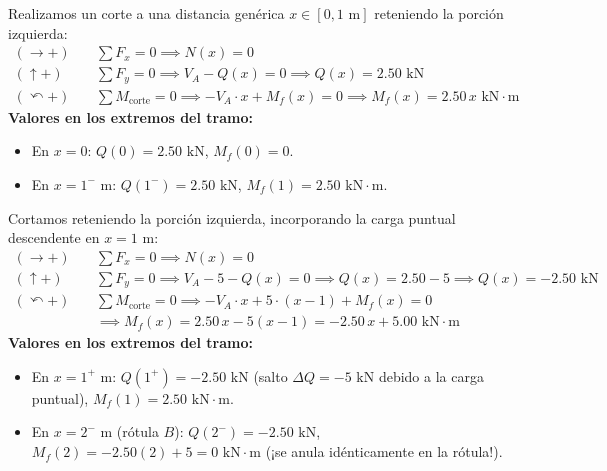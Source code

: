 Realizamos un corte a una distancia genérica $x \in [0, 1\text{ m}]$ reteniendo la porción izquierda:
\begin{align*}
    (\rightarrow +) \quad &\sum F_x = 0 \implies \boxed{N(x) = 0} \\
    (\uparrow +) \quad &\sum F_y = 0 \implies V_A - Q(x) = 0 \implies \boxed{Q(x) = 2.50\text{ kN}} \\
    (\curvearrowleft +) \quad &\sum M_{\text{corte}} = 0 \implies -V_A \cdot x + M_f(x) = 0 \implies \boxed{M_f(x) = 2.50\,x\text{ kN}\cdot\text{m}}
\end{align*}
\textbf{Valores en los extremos del tramo:}
\begin{itemize}
    \item En $x = 0$: $Q(0) = 2.50\text{ kN}$, \quad $M_f(0) = 0$.
    \item En $x = 1^-\text{ m}$: $Q(1^-) = 2.50\text{ kN}$, \quad $M_f(1) = 2.50\text{ kN}\cdot\text{m}$.
\end{itemize}

Cortamos reteniendo la porción izquierda, incorporando la carga puntual descendente en $x=1\text{ m}$:
\begin{align*}
    (\rightarrow +) \quad &\sum F_x = 0 \implies \boxed{N(x) = 0} \\
    (\uparrow +) \quad &\sum F_y = 0 \implies V_A - 5 - Q(x) = 0 \implies Q(x) = 2.50 - 5 \implies \boxed{Q(x) = -2.50\text{ kN}} \\
    (\curvearrowleft +) \quad &\sum M_{\text{corte}} = 0 \implies -V_A \cdot x + 5 \cdot (x - 1) + M_f(x) = 0 \\
    &\implies M_f(x) = 2.50\,x - 5(x - 1) = -2.50\,x + 5.00\text{ kN}\cdot\text{m}
\end{align*}
\textbf{Valores en los extremos del tramo:}
\begin{itemize}
    \item En $x = 1^+\text{ m}$: $Q(1^+) = -2.50\text{ kN}$ (salto $\Delta Q = -5\text{ kN}$ debido a la carga puntual), \quad $M_f(1) = 2.50\text{ kN}\cdot\text{m}$.
    \item En $x = 2^-\text{ m}$ (rótula $B$): $Q(2^-) = -2.50\text{ kN}$, \quad $M_f(2) = -2.50(2) + 5 = 0\text{ kN}\cdot\text{m}$ (¡se anula idénticamente en la rótula!).
\end{itemize}


